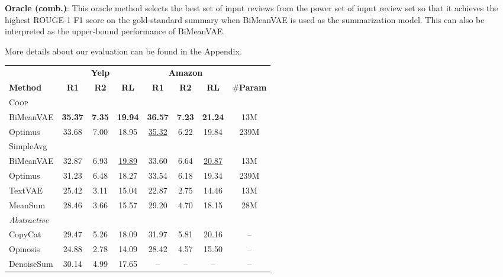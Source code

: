 \documentclass[11pt]{article}
\newcommand{\aggname}{\textsc{Coop}}
\newcommand{\name}{\mbox{\sc BiMeanVAE}}
\newcommand{\simpleavg}{\mbox{SimpleAvg}}
\newcommand{\yelp}{\mbox{\bf Yelp}}
\newcommand{\amazon}{\mbox{\bf Amazon}}
\newcommand{\hl}[1]{#1}
\begin{document}
\noindent
{\bf Oracle (comb.)}: This oracle method selects the best set of input reviews from the power set  of input review set  so that it achieves the highest ROUGE-1 F1 score on the gold-standard summary when \name{} is used as the summarization model. This can also be interpreted as the upper-bound performance of \name{}.

\hl{More details about our evaluation can be found in the Appendix.}
\begin{table*}[t]
\centering
\small
\begin{tabular}{lccccccc}\toprule
& \multicolumn{3}{c}{\yelp} & \multicolumn{3}{c}{\amazon} & \\
\textbf{Method} & \textbf{R1} & \textbf{R2} & \textbf{RL} & \textbf{R1} & \textbf{R2} & \textbf{RL} & \#\textbf{Param} \\\midrule
\aggname\\
\quad \name &\textbf{35.37} & \textbf{7.35} & \textbf{19.94} & \textbf{36.57} & \textbf{7.23} & \textbf{21.24} & 13M \\
\quad Optimus & 33.68 & 7.00 & 18.95 & \underline{35.32} & 6.22 & 19.84 & 239M \\\midrule
\simpleavg \\
\quad \name & 32.87 & 6.93 & \underline{19.89} & 33.60 & 6.64 & \underline{20.87} & 13M \\
\quad Optimus & 31.23 & 6.48 & 18.27 & 33.54 & 6.18 & 19.34 & 239M \\
\quad TextVAE & 25.42 & 3.11 & 15.04 & 22.87 & 2.75 & 14.46 & 13M\\
\quad MeanSum & 28.46 & 3.66 & 15.57 & 29.20 & 4.70 & 18.15 & 28M\\\midrule
\textit{Abstractive}\\
\quad CopyCat & 29.47 & 5.26 & 18.09 & 31.97 & 5.81 & 20.16 & -- \\
\quad Opinosis & 24.88 & 2.78 & 14.09 & 28.42 & 4.57 & 15.50 & --\\
\quad DenoiseSum & 30.14 & 4.99 & 17.65 & -- & -- & -- & -- \\


\end{tabular}
\end{table*}
\end{document}
